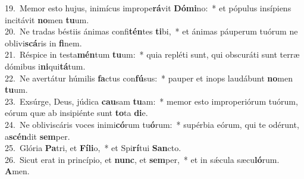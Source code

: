{19.~}Memor esto hujus, inimícus imprope\textbf{rá}vit \textbf{Dó}\textbf{mi}no:~* et pópulus insípiens incitávit \textbf{no}men \textbf{tu}um.\\
{20.~}Ne tradas béstiis ánimas confi\textbf{tén}tes \textbf{ti}bi,~* et ánimas páuperum tuórum ne oblivi\textbf{scá}ris in \textbf{fi}nem.\\
{21.~}Réspice in testa\textbf{mén}tum \textbf{tu}um:~* quia repléti sunt, qui obscuráti sunt terræ dómibus i\textbf{ni}qui\textbf{tá}tum.\\
{22.~}Ne avertátur húmilis \textbf{fa}ctus con\textbf{fú}sus:~* pauper et inops laudábunt \textbf{no}men \textbf{tu}um.\\
{23.~}Exsúrge, Deus, júdica \textbf{cau}sam \textbf{tu}am:~* memor esto improperiórum tuórum, eórum quæ ab insipiénte sunt \textbf{to}ta \textbf{di}e.\\
{24.~}Ne obliviscáris voces inimi\textbf{có}rum tu\textbf{ó}rum:~* supérbia eórum, qui te odérunt, a\textbf{scén}dit \textbf{sem}per.\\
{25.~}Glória \textbf{Pa}tri, et \textbf{Fí}\textbf{li}o,~* et Spi\textbf{rí}tui \textbf{San}cto.\\
{26.~}Sicut erat in princípio, et \textbf{nunc}, et \textbf{sem}per,~* et in sǽcula sæcu\textbf{ló}rum. \textbf{A}men.\\
